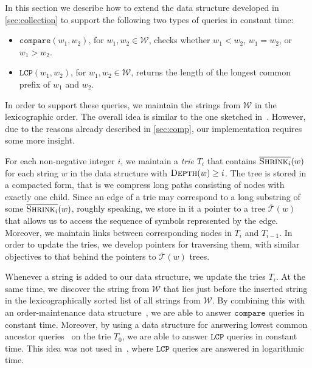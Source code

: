 \documentclass[a4paper]{article}
\theoremstyle{remark}
\newcommand{\compop}{\mathtt{compare}}
\newcommand{\lcpop}{\mathtt{LCP}}
\newcommand{\depth}{\textsc{Depth}}
\newcommand{\cshrink}[1]{\ensuremath{\overline{\textsc{Shrink}_{#1}}}}
\newcommand{\str}{w}
\newcommand{\ustree}{\mathcal{\overline{T}}}
\newcommand{\coll}{\mathcal{W}}
\begin{document}
\newcommand{\tval}{\mathtt{val}}
\newcommand{\tlink}{\mathtt{link}}
\newcommand{\tleaf}{\mathtt{leaf}}
\newcommand{\tsub}{\mathtt{sub}}
\newcommand{\tlca}{\mathtt{lca}}
\newcommand{\troot}{\mathtt{root}}
\newcommand{\tdepth}{\mathtt{depth}}
\newcommand{\tup}{\mathtt{up}}
\newcommand{\tdown}{\mathtt{down}}
\newcommand{\tmake}{\mathtt{make\_explicit}}
\newcommand{\taddleaf}{\mathtt{add\_leaf}}


In this section we describe how to extend the data structure developed in \cref{sec:collection} to support the following two types of queries
in constant time:
\begin{itemize}
  \item $\compop(\str_1,\str_2)$, for $\str_1,\str_2\in \coll$,  checks whether $\str_1<\str_2$,
    $\str_1=\str_2$, or $\str_1>\str_2$.
  \item $\lcpop(\str_1,\str_2)$, for $\str_1,\str_2\in \coll$, returns the length of the longest common prefix
    of $\str_1$ and $\str_2$.
\end{itemize}

In order to support these queries, we maintain the strings from $\coll$ in the lexicographic order.
The overall idea is similar to the one sketched in~\cite{Alstrup}.
However, due to the reasons already described in \cref{sec:comp}, our implementation requires some more insight.

For each non-negative integer $i$, we maintain a \emph{trie} $T_i$ that contains $\cshrink{i}(\str)$ for each string $\str$ in the data structure
with $\depth(w)\ge i$.
The tree is stored in a compacted form, that is we compress long paths consisting of nodes with exactly one child.
Since an edge of a trie may correspond to a long substring of some $\cshrink{i}(\str)$, roughly speaking, we store in it a pointer to a tree $\ustree(\str)$ that allows us to access the sequence of symbols represented by the edge.
Moreover, we maintain links between corresponding nodes in $T_i$ and $T_{i-1}$.
In order to update the tries, we develop pointers for traversing them, with similar objectives to that behind the pointers to $\ustree(\str)$ trees.

Whenever a string is added to our data structure, we update the tries $T_i$.
At the same time, we discover the string from $\coll$ that lies just before the inserted string in the lexicographically sorted list of all strings from $\coll$.
By combining this with an order-maintenance data structure~\cite{Dietz:1987,Bender:2002}, we are able to answer $\compop$ queries in constant time.
Moreover, by using a data structure for answering lowest common ancestor queries~\cite{Cole:2005} on the trie $T_0$, we are able to answer $\lcpop$ queries in constant time.
This idea was not used in~\cite{Alstrup}, where $\lcpop$ queries are answered in logarithmic time.
\end{document}
